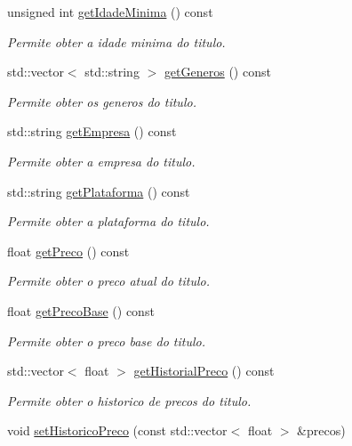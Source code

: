 \begin{DoxyCompactItemize}
unsigned int \hyperlink{classTitulo_a8048db7604abd58892122c810a6794be}{get\+Idade\+Minima} () const
\begin{DoxyCompactList}\small\item\em Permite obter a idade minima do titulo. \end{DoxyCompactList}\item 
std\+::vector$<$ std\+::string $>$ \hyperlink{classTitulo_a09992b973f8cfe755f21ff725b2970f0}{get\+Generos} () const
\begin{DoxyCompactList}\small\item\em Permite obter os generos do titulo. \end{DoxyCompactList}\item 
std\+::string \hyperlink{classTitulo_a48d810fe27da41cfb726fb5680a68471}{get\+Empresa} () const
\begin{DoxyCompactList}\small\item\em Permite obter a empresa do titulo. \end{DoxyCompactList}\item 
std\+::string \hyperlink{classTitulo_a2a57a31d40c5df012b3c6e2451c253dd}{get\+Plataforma} () const
\begin{DoxyCompactList}\small\item\em Permite obter a plataforma do titulo. \end{DoxyCompactList}\item 
float \hyperlink{classTitulo_a93725bdc2e98350e47b54fd76c0fa236}{get\+Preco} () const
\begin{DoxyCompactList}\small\item\em Permite obter o preco atual do titulo. \end{DoxyCompactList}\item 
float \hyperlink{classTitulo_a5257cbaf35ad018001a7e48678795305}{get\+Preco\+Base} () const
\begin{DoxyCompactList}\small\item\em Permite obter o preco base do titulo. \end{DoxyCompactList}\item 
std\+::vector$<$ float $>$ \hyperlink{classTitulo_ab392d79a55b0ce556e03ad5a2fecad05}{get\+Historial\+Preco} () const
\begin{DoxyCompactList}\small\item\em Permite obter o historico de precos do titulo. \end{DoxyCompactList}\item 
void \hyperlink{classTitulo_a8ea091928732a5ff5b974e003668a778}{set\+Historico\+Preco} (const std\+::vector$<$ float $>$ \&precos)

\end{DoxyCompactItemize}
